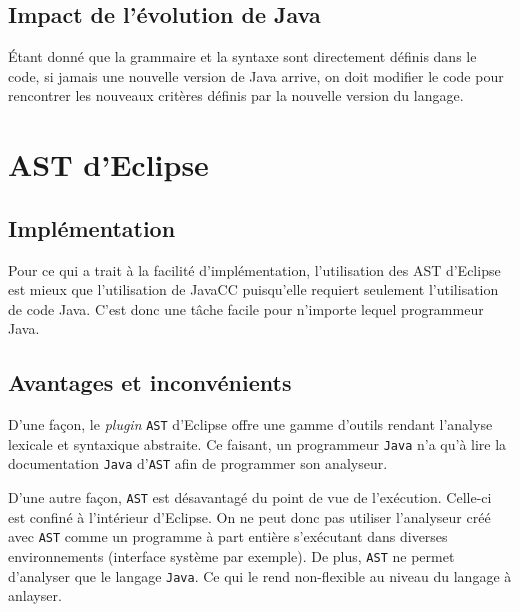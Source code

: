 \documentclass[11pt,french]{article}
\begin{document}
        \subsection{Impact de l'évolution de Java} %
        \label{sub:impact-evolution-java}
        Étant donné que la grammaire et la syntaxe sont directement définis dans le code, si jamais une nouvelle version
        de Java arrive, on doit modifier le code pour rencontrer les nouveaux critères définis par la nouvelle version du
        langage.

    \section{AST d'Eclipse} %
    \label{sec:ast-eclipse}
        \subsection{Implémentation} %
        \label{sub:implementation}
        Pour ce qui a trait à la facilité d'implémentation, l'utilisation des AST d'Eclipse est mieux que l'utilisation de
        JavaCC puisqu'elle requiert seulement l'utilisation de code Java. C'est donc une tâche facile pour n'importe lequel
        programmeur Java.
        \subsection{Avantages et inconvénients} %
        \label{sub:avantages-inconvenients}
            D'une façon, le {\it plugin} {\tt AST} d'Eclipse offre une gamme d'outils rendant
            l'analyse lexicale et syntaxique abstraite. Ce faisant, un programmeur {\tt Java} n'a
            qu'à lire la documentation {\tt Java} d'{\tt AST} afin de programmer son analyseur.

            D'une autre façon, {\tt AST} est désavantagé du point de vue de l'exécution. Celle-ci
            est confiné à l'intérieur d'Eclipse. On ne peut donc pas utiliser l'analyseur créé avec
            {\tt AST} comme un programme à part entière s'exécutant dans diverses environnements
            (interface système par exemple). De plus, {\tt AST} ne permet d'analyser que le langage
            {\tt Java}. Ce qui le rend non-flexible au niveau du langage à anlayser.
\end{document}

